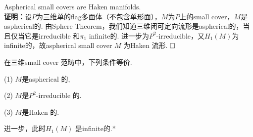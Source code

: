 \documentclass{article}
\theoremstyle{plain}%
\theoremstyle{definition}
\theoremstyle{remark}
\begin{document}
{\cor  Aspherical small covers are Haken manifolds.
}\\
{\bf 证明：}设$P$为三维单的flag多面体（不包含单形面），$M$为$P$上的small cover，$M$是aspherical的. 由Sphere Theorem，我们知道三维闭可定向流形是aspherical的，当且仅当它是irreducible 和$\pi_1$ infinite的. 进一步为$P^2$-irreducible，又$H_1(M)$为infinite的，故aspherical small cover $M$ 为Haken 流形. $\hfill{} \Box$

{\thm 在三维small cover 范畴中，下列条件等价.\\
\item[(1)]  $M$是aspherical 的,
\item[(2)]  $M$是$P^2$-irreducible 的.
\item[(3)]  $M$是Haken 的.

进一步，此时$H_1(M)$ 是infinite的.*
}

\end{document}
